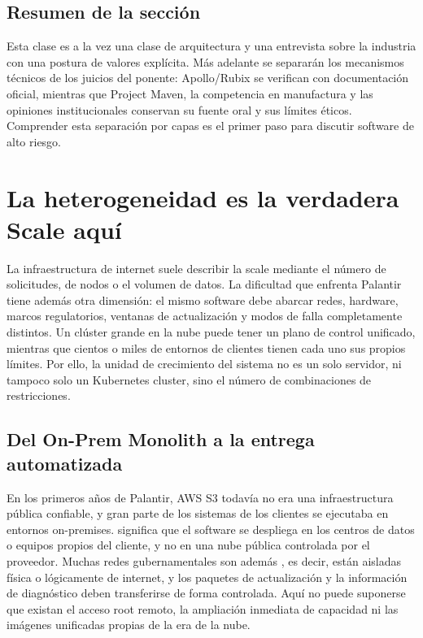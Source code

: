 \documentclass[a4paper]{article}
\begin{document}
\subsection{Resumen de la sección}

Esta clase es a la vez una clase de arquitectura y una entrevista sobre la industria con una postura de valores explícita. Más adelante se separarán los mecanismos técnicos de los juicios del ponente: Apollo/Rubix se verifican con documentación oficial, mientras que Project Maven, la competencia en manufactura y las opiniones institucionales conservan su fuente oral y sus límites éticos. Comprender esta separación por capas es el primer paso para discutir software de alto riesgo.
\section{La heterogeneidad es la verdadera Scale aquí}

La infraestructura de internet suele describir la scale mediante el número de solicitudes, de nodos o el volumen de datos. La dificultad que enfrenta Palantir tiene además otra dimensión: el mismo software debe abarcar redes, hardware, marcos regulatorios, ventanas de actualización y modos de falla completamente distintos. Un clúster grande en la nube puede tener un plano de control unificado, mientras que cientos o miles de entornos de clientes tienen cada uno sus propios límites. Por ello, la unidad de crecimiento del sistema no es un solo servidor, ni tampoco solo un Kubernetes cluster, sino el número de combinaciones de restricciones.

\subsection{Del On-Prem Monolith a la entrega automatizada}

En los primeros años de Palantir, AWS S3 todavía no era una infraestructura pública confiable, y gran parte de los sistemas de los clientes se ejecutaba en entornos on-premises.  significa que el software se despliega en los centros de datos o equipos propios del cliente, y no en una nube pública controlada por el proveedor. Muchas redes gubernamentales son además , es decir, están aisladas física o lógicamente de internet, y los paquetes de actualización y la información de diagnóstico deben transferirse de forma controlada. Aquí no puede suponerse que existan el acceso root remoto, la ampliación inmediata de capacidad ni las imágenes unificadas propias de la era de la nube.
\end{document}
